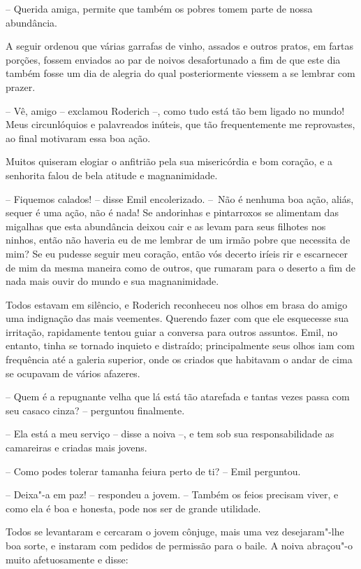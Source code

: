 -- Querida amiga, permite que também os pobres tomem parte de nossa
abundância.

A seguir ordenou que várias garrafas de vinho, assados e outros pratos,
em fartas porções, fossem enviados ao par de noivos desafortunado a fim
de que este dia também fosse um dia de alegria do qual posteriormente
viessem a se lembrar com prazer.

-- Vê, amigo -- exclamou Roderich --, como tudo está tão bem ligado no
mundo! Meus circunlóquios e palavreados inúteis, que tão frequentemente
me reprovastes, ao final motivaram essa boa ação.

Muitos quiseram elogiar o anfitrião pela sua misericórdia e bom coração,
e a senhorita falou de bela atitude e magnanimidade. 

-- Fiquemos calados! -- disse Emil encolerizado. \mbox{-- Não} é nenhuma boa
ação, aliás, sequer é uma ação, não é nada! Se andorinhas e pintarroxos
se alimentam das migalhas que esta abundância deixou cair e as levam
para seus filhotes nos ninhos, então não haveria eu de me lembrar de um
irmão pobre que necessita de mim? Se eu pudesse seguir meu coração,
então vós decerto iríeis rir e escarnecer de mim da mesma maneira como
de outros, que rumaram para o deserto a fim de nada mais ouvir do mundo
e sua magnanimidade.

Todos estavam em silêncio, e Roderich reconheceu nos olhos em brasa do
amigo uma indignação das mais veementes. Querendo fazer com que ele
esquecesse sua irritação, rapidamente tentou guiar a conversa para
outros assuntos. Emil, no entanto, tinha se tornado inquieto e
distraído; principalmente seus olhos iam com frequência até a galeria
superior, onde os criados que habitavam o andar de cima se ocupavam de
vários afazeres. 

-- Quem é a repugnante velha que lá está tão atarefada e tantas
vezes passa com seu casaco cinza? -- perguntou finalmente.

-- Ela está a meu serviço -- disse a noiva --, e tem sob sua
responsabilidade as camareiras e criadas mais jovens.

-- Como podes tolerar tamanha feiura perto de ti? -- Emil perguntou.

-- Deixa"-a em paz! -- respondeu a jovem. -- Também os feios precisam
viver, e como ela é boa e honesta, pode nos ser de grande utilidade.
 
Todos se levantaram e cercaram o jovem cônjuge, mais uma vez
desejaram"-lhe boa sorte, e instaram com pedidos de permissão para o
baile. A noiva abraçou"-o muito afetuosamente e disse:

